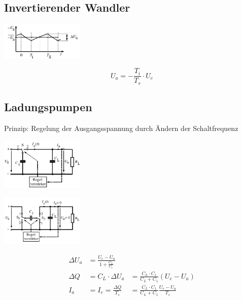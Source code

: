 \subsection{Invertierender Wandler}
	\begin{minipage}{6cm}
		\includegraphics[width=4cm]{./images/invWandler-Verhalten}
	\end{minipage}
	\begin{minipage}{12cm}
		\[ U_a = -\frac{T_i}{T_s} \cdot U_e \]
	\end{minipage}

\subsection{Ladungspumpen}
	Prinzip: Regelung der Ausgangsspannung durch Ändern der Schaltfrequenz \\
	\begin{minipage}{5cm}
		\includegraphics[width=4cm]{./images/ladungspumpe-normal}
	\end{minipage}
	\begin{minipage}{5cm}
		\includegraphics[width=4cm]{./images/ladungspumpe-inv}
	\end{minipage}
	\begin{minipage}{6cm}
		\begin{align*}
			\Delta U_a &= \frac{U_e - U_a}{1 + \frac{C_L}{C_1}} \\
			\Delta Q &= C_L \cdot \Delta U_a &= \frac{C_L \cdot C_1}{C_L + C_1} (U_e - U_a) \\
			I_a &= I_e = \frac{\Delta Q}{T_s} &= \frac{C_L \cdot C_1}{C_L + C_1} \frac{U_e - U_a}{T_s}
		\end{align*}
	\end{minipage}
	
